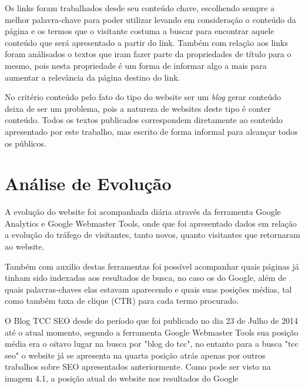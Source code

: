 \documentclass[
	12pt,				%
	openright,			%
	twoside,			%
	a4paper,			%
	english,			%
	french,				%
	spanish,			%
	brazil				%
	]{abntex2}
\begin{document}
Os links foram trabalhados desde seu conteúdo chave, escolhendo sempre a melhor palavra-chave para poder utilizar levando em consideração o conteúdo da página e os termos que o visitante costuma a buscar para encontrar aquele conteúdo que será apresentado a partir do link. Também com relação aos links foram análisados o textos que iram fazer parte da propriedades de título para o mesmo, pois nesta propriedade é um forma de informar algo a mais para aumentar a relevância da página destino do link.

No critério conteúdo pelo fato do tipo do website ser um \textit{blog} gerar conteúdo deixa de ser um problema, pois a natureza de websites deste tipo é conter conteúdo. Todos os textos publicados correspondem diretamente ao conteúdo apresentado por este trabalho, mas escrito de forma informal para alcançar todos os públicos.

\section{Análise de Evolução}

A evolução do website foi acompanhada diária através da ferramenta Google Analytics e Google Webmaster Tools, onde que foi apresentado dados em relação a evolução do tráfego de visitantes, tanto novos, quanto visitantes que retornaram ao website.

Também com auxilio destas ferramentas foi possível acompanhar quais páginas já tinham sido indexadas aos resultados de busca, no caso os do Google, além de quais palavras-chaves elas estavam aparecendo e quais suas posições médias, tal como também taxa de clique (CTR) para cada termo procurado.

O Blog TCC SEO desde do período que foi publicado no dia 23 de Julho de 2014 até o atual momento, segundo a ferramenta Google Webmaster Tools sua posição média era o oitavo lugar na busca por "blog do tcc", no entanto para a busca "tcc seo" o website já se apresenta na quarta posição atrás apenas por outros trabalhos sobre SEO apresentados anteriormente. Como pode ser visto na imagem 4.1, a posição atual do website nos resultados do Google





\end{document}
